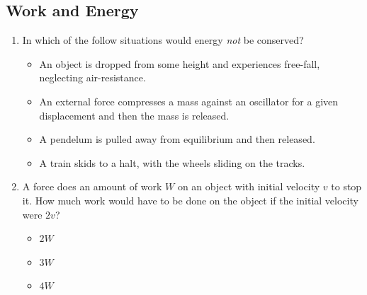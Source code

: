 \documentclass[10pt]{article}
\begin{document}
\subsection{Work and Energy}
\begin{enumerate}
\item In which of the follow situations would energy \textit{not} be conserved?
\begin{itemize}
\item An object is dropped from some height and experiences free-fall, neglecting air-resistance.
\item An external force compresses a mass against an oscillator for a given displacement and then the mass is released.
\item A pendelum is pulled away from equilibrium and then released.
\item A train skids to a halt, with the wheels sliding on the tracks.
\end{itemize}
\item A force does an amount of work $W$ on an object with initial velocity $v$ to stop it.  How much work would have to be done on the object if the initial velocity were $2v$?
\begin{itemize}
\item $2W$
\item $3W$
\item $4W$
\end{itemize}
\end{enumerate}
\end{document}
